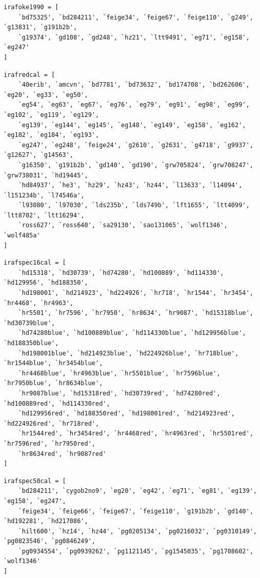 \documentclass[twocolumn, linenumbers]{aastex631}
\begin{document}
\begin{verbatim}
irafoke1990 = [
    `bd75325', `bd284211', `feige34', `feige67', `feige110', `g249', `g13831', `g191b2b',
    `g19374', `gd108', `gd248', `hz21', `ltt9491', `eg71', `eg158', `eg247'
]
\end{verbatim}

\begin{verbatim}
irafredcal = [
    `40erib', `amcvn', `bd7781', `bd73632', `bd174708', `bd262606', `eg20', `eg33', `eg50',
    `eg54', `eg63', `eg67', `eg76', `eg79', `eg91', `eg98', `eg99', `eg102', `eg119', `eg129',
    `eg139', `eg144', `eg145', `eg148', `eg149', `eg158', `eg162', `eg182', `eg184', `eg193',
    `eg247', `eg248', `feige24', `g2610', `g2631', `g4718', `g9937', `g12627', `g14563',
    `g16350', `g191b2b', `gd140', `gd190', `grw705824', `grw708247', `grw738031', `hd19445',
    `hd84937', `he3', `hz29', `hz43', `hz44', `l13633', `l14094', `l151234b', `l74546a',
    `l93080', `l97030', `lds235b', `lds749b', `lft1655', `ltt4099', `ltt8702', `ltt16294',
    `ross627', `ross640', `sa29130', `sao131065', `wolf1346', `wolf485a'
]
\end{verbatim}

\begin{verbatim}
irafspec16cal = [
    `hd15318', `hd30739', `hd74280', `hd100889', `hd114330', `hd129956', `hd188350',
    `hd198001', `hd214923', `hd224926', `hr718', `hr1544', `hr3454', `hr4468', `hr4963',
    `hr5501', `hr7596', `hr7950', `hr8634', `hr9087', `hd15318blue', `hd30739blue',
    `hd74280blue', `hd100889blue', `hd114330blue', `hd129956blue', `hd188350blue',
    `hd198001blue', `hd214923blue', `hd224926blue', `hr718blue', `hr1544blue', `hr3454blue',
    `hr4468blue', `hr4963blue', `hr5501blue', `hr7596blue', `hr7950blue', `hr8634blue',
    `hr9087blue', `hd15318red', `hd30739red', `hd74280red', `hd100889red', `hd114330red',
    `hd129956red', `hd188350red', `hd198001red', `hd214923red', `hd224926red', `hr718red',
    `hr1544red', `hr3454red', `hr4468red', `hr4963red', `hr5501red', `hr7596red', `hr7950red',
    `hr8634red', `hr9087red'
]
\end{verbatim}

\begin{verbatim}
irafspec50cal = [
    `bd284211', `cygob2no9', `eg20', `eg42', `eg71', `eg81', `eg139', `eg158', `eg247',
    `feige34', `feige66', `feige67', `feige110', `g191b2b', `gd140', `hd192281', `hd217086',
    `hilt600', `hz14', `hz44', `pg0205134', `pg0216032', `pg0310149', `pg0823546', `pg0846249',
    `pg0934554', `pg0939262', `pg1121145', `pg1545035', `pg1708602', `wolf1346'
]
\end{verbatim}
\end{document}
